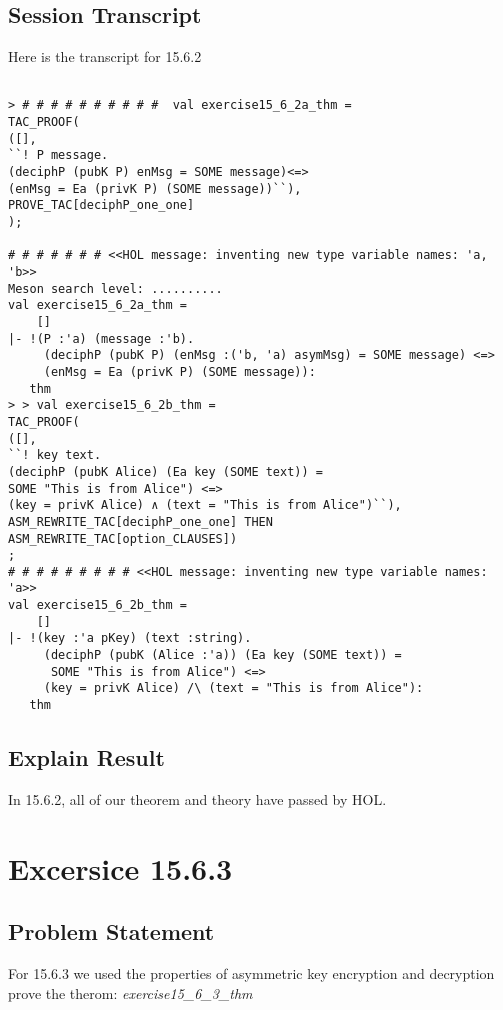 \documentclass{report}
\begin{document}
\section{Session Transcript}
\label{Session Trans 1562}
Here is the transcript for 15.6.2
\setcounter{sessioncount}{0}
\begin{session}
  \begin{scriptsize}
\begin{verbatim}

> # # # # # # # # # #  val exercise15_6_2a_thm =
TAC_PROOF(
([],
``! P message.
(deciphP (pubK P) enMsg = SOME message)<=>
(enMsg = Ea (privK P) (SOME message))``),
PROVE_TAC[deciphP_one_one]
);

# # # # # # # <<HOL message: inventing new type variable names: 'a, 'b>>
Meson search level: ..........
val exercise15_6_2a_thm =
    []
|- !(P :'a) (message :'b).
     (deciphP (pubK P) (enMsg :('b, 'a) asymMsg) = SOME message) <=>
     (enMsg = Ea (privK P) (SOME message)):
   thm
> > val exercise15_6_2b_thm =
TAC_PROOF(
([],
``! key text.
(deciphP (pubK Alice) (Ea key (SOME text)) =
SOME "This is from Alice") <=>
(key = privK Alice) ∧ (text = "This is from Alice")``),
ASM_REWRITE_TAC[deciphP_one_one] THEN
ASM_REWRITE_TAC[option_CLAUSES])
;
# # # # # # # # # <<HOL message: inventing new type variable names: 'a>>
val exercise15_6_2b_thm =
    []
|- !(key :'a pKey) (text :string).
     (deciphP (pubK (Alice :'a)) (Ea key (SOME text)) =
      SOME "This is from Alice") <=>
     (key = privK Alice) /\ (text = "This is from Alice"):
   thm

\end{verbatim}
  \end{scriptsize}
\end{session}
\section{Explain Result}
\label{explain result 1562}
In 15.6.2, all of our theorem and theory have passed by HOL.


\chapter{Excersice 15.6.3}
\label{Ex 1563}
\section{Problem Statement}
\label{Problem State 1563}
For 15.6.3 we  used the properties of asymmetric key encryption and decryption prove the therom:
\emph{exercise15_6_3_thm}\HOLcryptoExercisesTheoremsexerciseOneFiveXXSixXXThreeXXthm
\end{document}

